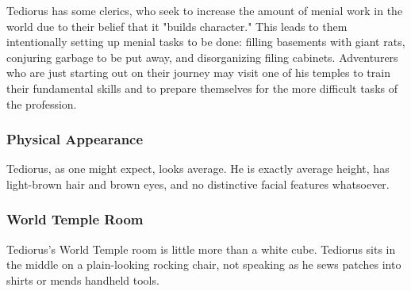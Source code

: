 Tediorus has some clerics, who seek to increase the amount of menial work in the world due to their belief that it "builds character."
This leads to them intentionally setting up menial tasks to be done: filling basements with giant rats, conjuring garbage to be put away, and disorganizing filing cabinets.
Adventurers who are just starting out on their journey may visit one of his temples to train their fundamental skills and to prepare themselves for the more difficult tasks of the profession.

\subsubsection*{Physical Appearance}
Tediorus, as one might expect, looks average.
He is exactly average height, has light-brown hair and brown eyes, and no distinctive facial features whatsoever.

\subsubsection*{World Temple Room}
Tediorus's World Temple room is little more than a white cube.
Tediorus sits in the middle on a plain-looking rocking chair, not speaking as he sews patches into shirts or mends handheld tools.